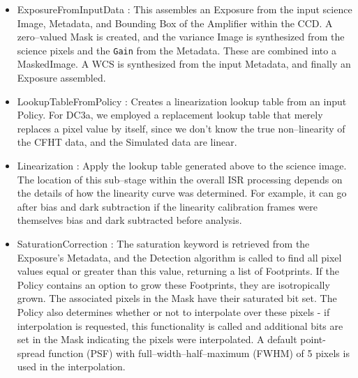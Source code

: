 \begin{itemize}

\item ExposureFromInputData : This assembles an Exposure from the
input science Image, Metadata, and Bounding Box of the Amplifier
within the CCD.  A zero--valued Mask is created, and the variance
Image is synthesized from the science pixels and the {\tt Gain} from
the Metadata.  These are combined into a MaskedImage.  A WCS is
synthesized from the input Metadata, and finally an Exposure assembled.

\item LookupTableFromPolicy : Creates a linearization lookup table
from an input Policy.
For DC3a, we employed a replacement lookup table that
merely replaces a pixel value by itself, since we don't know the true
non--linearity of the CFHT data, and the Simulated data are linear.

\item Linearization : Apply the lookup table generated above to the
science image.  The location of this sub--stage within the overall ISR
processing depends on the details of how the linearity curve was
determined.  For example, it can go after bias and dark subtraction
if the linearity calibration frames were themselves bias and dark
subtracted before analysis.

\item SaturationCorrection : The saturation keyword is retrieved from
the Exposure's Metadata, and the Detection algorithm is called to find
all pixel values equal or greater than this value, returning a list of
Footprints.  If the Policy contains an option to grow these
Footprints, they are isotropically grown.  The associated pixels in
the Mask have their saturated bit set.  The Policy also determines
whether or not to interpolate over these pixels - if interpolation is
requested, this functionality is called and additional bits are set in
the Mask indicating the pixels were interpolated.  A default
point-spread function (PSF) with full--width--half--maximum (FWHM) of
5 pixels is used in the interpolation.


\end{itemize}
